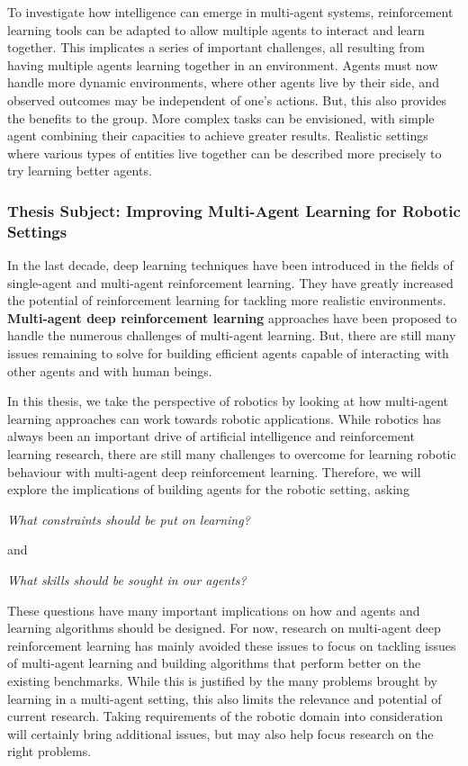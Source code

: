To investigate how intelligence can emerge in multi-agent systems, reinforcement learning tools can be adapted to allow multiple agents to interact and learn together. This implicates a series of important challenges, all resulting from having multiple agents learning together in an environment. Agents must now handle more dynamic environments, where other agents live by their side, and observed outcomes may be independent of one's actions. But, this also provides the benefits to the group. More complex tasks can be envisioned, with simple agent combining their capacities to achieve greater results. Realistic settings where various types of entities live together can be described more precisely to try learning better agents. 


\subsubsection{Thesis Subject: Improving Multi-Agent Learning for Robotic Settings}

In the last decade, deep learning techniques have been introduced in the fields of single-agent and multi-agent reinforcement learning. They have greatly increased the potential of reinforcement learning for tackling more realistic environments. \textbf{Multi-agent deep reinforcement learning} approaches have been proposed to handle the numerous challenges of multi-agent learning. But, there are still many issues remaining to solve for building efficient agents capable of interacting with other agents and with human beings. 

In this thesis, we take the perspective of robotics by looking at how multi-agent learning approaches can work towards robotic applications. While robotics has always been an important drive of artificial intelligence and reinforcement learning research, there are still many challenges to overcome for learning robotic behaviour with multi-agent deep reinforcement learning. Therefore, we will explore the implications of building agents for the robotic setting, asking
\vspace{3pt}
\begin{center}
    \textit{What constraints should be put on learning?}
\end{center}
and
\begin{center}
    \textit{What skills should be sought in our agents?} 
\end{center}
\vspace{3pt} 
These questions have many important implications on how and agents and learning algorithms should be designed. For now, research on multi-agent deep reinforcement learning has mainly avoided these issues to focus on tackling issues of multi-agent learning and building algorithms that perform better on the existing benchmarks. While this is justified by the many problems brought by learning in a multi-agent setting, this also limits the relevance and potential of current research. Taking requirements of the robotic domain into consideration will certainly bring additional issues, but may also help focus research on the right problems. 

